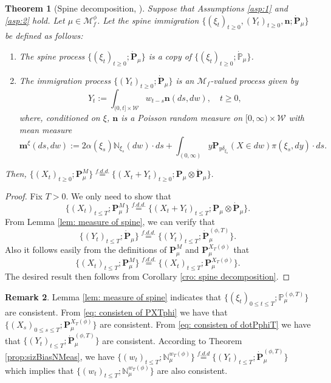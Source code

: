 \documentclass[UTF8]{pkuthss}
\theoremstyle{plain}
\newtheorem{thm}{Theorem}[section]
\theoremstyle{definition}
\newtheorem{rem}[thm]{Remark}
\numberwithin{equation}{section}
\begin{document}
\begin{thm}[{Spine decomposition, \cite{EckhoffKyprianouWinkel2015Spines, EnglanderKyprianou2004Local,LiuRenSong2009LlogL}}]
\label{thm:spinDec}
	Suppose that Assumptions \ref{asp:1} and \ref{asp:2} hold.
	Let $\mu \in \mathcal M_f^\phi$.
Let the spine immigration
	$\{(\xi_t)_{t\geq 0}, (Y_t)_{t\geq 0}, \mathbf n; \dot {\mathbf P}_\mu\}$ be defined as follows:
\begin{enumerate}
\item
	The \emph{spine process} $\{(\xi_t)_{t\geq 0}; \dot{\mathbf P}_\mu\}$ is a copy of $\{(\xi_t)_{t\geq 0}; \dot{\mathbb P}_{\mu}\}$.
\item
	The \emph{immigration process} $\{(Y_t)_{t\geq 0}; \dot{\mathbf P}_\mu\}$ is an $\mathcal M_f$-valued process given by
\[
	Y_t
	:= \int_{(0,t] \times \mathcal W} w_{t-s} \mathbf n(ds,dw),
	\quad t \geq 0,
\]
	where, conditioned on $\xi$, $\mathbf n$ is a Poisson random measure on $[0,\infty) \times \mathcal W$ with mean measure
\[
	\mathbf m^\xi(ds,dw)
:=  2 \alpha(\xi_s)\mathbb N_{\xi_s}(dw)\cdot ds
+ \int_{(0,\infty)} y \mathbf P_{y \delta_{\xi_s}}(X\in dw) \pi(\xi_s,dy)\cdot ds.
\]
\end{enumerate}
	Then,
$
    \{(X_t)_{t\geq 0}; \mathbf P_\mu^M\}
    \overset{f.d.d.}{=} \{(X_t + Y_t)_{t\geq 0}; \mathbf P_\mu \otimes\dot{\mathbf P}_\mu\}.
$
\end{thm}	

\begin{proof}
	Fix $T>0$.
	We only need to show that
\[
	\{(X_t)_{t\leq T}; \mathbf P_\mu^M\}
	\overset{f.d.d.}{=} \{(X_t + Y_t)_{t\leq T}; \mathbf P_\mu\otimes\dot{\mathbf P}_\mu\}.
\]
From Lemma \ref{lem: measure of spine},
	we can verify that
\begin{equation}
\label{eq: consisten of dotPphiT}
	\{(Y_t)_{t\leq T}; \dot{\mathbf P}_\mu\}
	\overset{f.d.d.}{=} \{(Y_t)_{t\leq T}; \dot{\mathbf P}^{(\phi,T)}_\mu\}.
\end{equation}
Also it follows easily from the definitions of $\mathbf P_\mu^M$ and $\mathbf P_\mu^{X_T(\phi)}$ that
\begin{equation}
\label{eq: consisten of PXTphi}
	\{(X_t)_{t\leq T}; \mathbf P_\mu^M\}
	\overset{f.d.d.}{=} \{(X_t)_{t\leq T}; \mathbf P_\mu^{X_T(\phi)}\}.	
\end{equation}
	The desired result then follows from Corollary \ref{cro: spine decomposition}.
\end{proof}
\begin{rem}
\label{rem: consistency}
	Lemma \ref{lem: measure of spine} indicates that $\{(\xi_t)_{0\leq t\leq T};\mathbb P_\mu^{(\phi, T)}\}$
		are consistent.
	From \eqref{eq: consisten of PXTphi} we have that $\{(X_s)_{0\leq s\leq T};\mathbf P_\mu^{X_T(\phi)}\}$
		are consistent.
	From \eqref{eq: consisten of dotPphiT} we have that $\{(Y_t)_{t\leq T}; \dot{\mathbf P}^{(\phi,T)}_\mu\}$
		are consistent.
	According to Theorem \ref{prop:sizBiasNMeas}, we have $\{(w_t)_{t\leq T}; \mathbb N^{w_T(\phi)}_\mu\} \overset{f.d.d}{=}\{(Y_t)_{t\leq T}; \dot{\mathbf P}^{(\phi,T)}_\mu\}$ which implies that $\{(w_t)_{t\leq T}; \mathbb N^{w_T(\phi)}_\mu\}$ are
	also consistent.
\end{rem}
\end{document}
